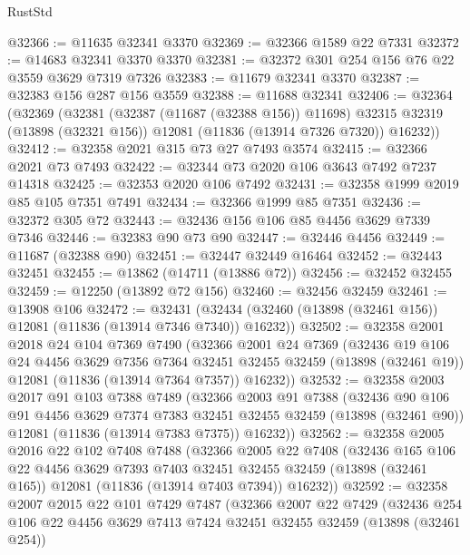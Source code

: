 \begin{lexlean}{RustStd}
\begin{coremodule}
@32366 := @11635 @32341 @3370
@32369 := @32366 @1589 @22 @7331
@32372 := @14683 @32341 @3370 @3370
@32381 := @32372 @301 @254 @156 @76 @22 @3559 @3629 @7319 @7326
@32383 := @11679 @32341 @3370
@32387 := @32383 @156 @287 @156 @3559
@32388 := @11688 @32341
@32406 := @32364
    (@32369
      (@32381
        (@32387 (@11687 (@32388 @156)) @11698)
        @32315
        @32319
        (@13898 (@32321 @156))
        @12081
        (@11836 (@13914 @7326 @7320))
        @16232))
@32412 := @32358 @2021 @315 @73 @27 @7493 @3574
@32415 := @32366 @2021 @73 @7493
@32422 := @32344 @73 @2020 @106 @3643 @7492 @7237 @14318
@32425 := @32353 @2020 @106 @7492
@32431 := @32358 @1999 @2019 @85 @105 @7351 @7491
@32434 := @32366 @1999 @85 @7351
@32436 := @32372 @305 @72
@32443 := @32436 @156 @106 @85 @4456 @3629 @7339 @7346
@32446 := @32383 @90 @73 @90
@32447 := @32446 @4456
@32449 := @11687 (@32388 @90)
@32451 := @32447 @32449 @16464
@32452 := @32443 @32451
@32455 := @13862 (@14711 (@13886 @72))
@32456 := @32452 @32455
@32459 := @12250 (@13892 @72 @156)
@32460 := @32456 @32459
@32461 := @13908 @106
@32472 := @32431
    (@32434 (@32460 (@13898 (@32461 @156)) @12081 (@11836 (@13914 @7346 @7340)) @16232))
@32502 := @32358
    @2001
    @2018
    @24
    @104
    @7369
    @7490
    (@32366
      @2001
      @24
      @7369
      (@32436
        @19
        @106
        @24
        @4456
        @3629
        @7356
        @7364
        @32451
        @32455
        @32459
        (@13898 (@32461 @19))
        @12081
        (@11836 (@13914 @7364 @7357))
        @16232))
@32532 := @32358
    @2003
    @2017
    @91
    @103
    @7388
    @7489
    (@32366
      @2003
      @91
      @7388
      (@32436
        @90
        @106
        @91
        @4456
        @3629
        @7374
        @7383
        @32451
        @32455
        @32459
        (@13898 (@32461 @90))
        @12081
        (@11836 (@13914 @7383 @7375))
        @16232))
@32562 := @32358
    @2005
    @2016
    @22
    @102
    @7408
    @7488
    (@32366
      @2005
      @22
      @7408
      (@32436
        @165
        @106
        @22
        @4456
        @3629
        @7393
        @7403
        @32451
        @32455
        @32459
        (@13898 (@32461 @165))
        @12081
        (@11836 (@13914 @7403 @7394))
        @16232))
@32592 := @32358
    @2007
    @2015
    @22
    @101
    @7429
    @7487
    (@32366
      @2007
      @22
      @7429
      (@32436
        @254
        @106
        @22
        @4456
        @3629
        @7413
        @7424
        @32451
        @32455
        @32459
        (@13898 (@32461 @254))

\end{coremodule}
\end{lexlean}
